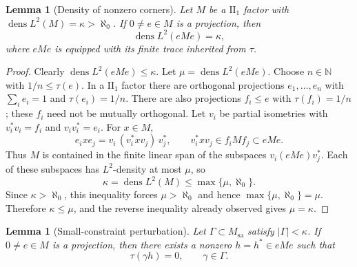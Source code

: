 \documentclass[11pt,letterpaper,reqno]{amsart}
\newtheorem{lem}[thm]{Lemma}
\theoremstyle{definition}
\numberwithin{equation}{section}
\newcommand{\sa}{\mathrm{sa}}
\newcommand{\NN}{\mathbb N}
\newcommand{\one}{1}
\DeclareMathOperator{\dens}{dens}
\begin{document}
\begin{lem}[Density of nonzero corners]\label{lem:corner-density}
Let $M$ be a $\mathrm{II}_1$ factor with $\dens L^2(M)=\kappa>\aleph_0$.  If $0\neq e\in M$ is a projection, then
\[
   \dens L^2(eMe)=\kappa,
\]
where $eMe$ is equipped with its finite trace inherited from $\tau$.
\end{lem}

\begin{proof}
Clearly $\dens L^2(eMe)\leq\kappa$.  Let $\mu=\dens L^2(eMe)$.  Choose $n\in\NN$ with $1/n\leq\tau(e)$.  In a $\mathrm{II}_1$ factor there are orthogonal projections $e_1,\ldots,e_n$ with $\sum_i e_i=\one$ and $\tau(e_i)=1/n$.  There are also projections $f_i\leq e$ with $\tau(f_i)=1/n$; these $f_i$ need not be mutually orthogonal.  Let $v_i$ be partial isometries with $v_i^*v_i=f_i$ and $v_iv_i^*=e_i$.  For $x\in M$,
\[
   e_i x e_j=v_i\,(v_i^*xv_j)\,v_j^*,
   \qquad v_i^*xv_j\in f_iMf_j\subset eMe.
\]
Thus $M$ is contained in the finite linear span of the subspaces $v_i(eMe)v_j^*$.  Each of these subspaces has $L^2$-density at most $\mu$, so
\[
   \kappa=\dens L^2(M)\leq\max\{\mu,\aleph_0\}.
\]
Since $\kappa>\aleph_0$, this inequality forces $\mu>\aleph_0$ and hence $\max\{\mu,\aleph_0\}=\mu$.  Therefore $\kappa\leq\mu$, and the reverse inequality already observed gives $\mu=\kappa$.
\end{proof}

\begin{lem}[Small-constraint perturbation]\label{lem:perturb}
Let $\Gamma\subset M_{\sa}$ satisfy $|\Gamma|<\kappa$.  If $0\neq e\in M$ is a projection, then there exists a nonzero $h=h^*\in eMe$ such that
\[
   \tau(\gamma h)=0,
   \qquad \gamma\in\Gamma.
\]
\end{lem}
\end{document}
